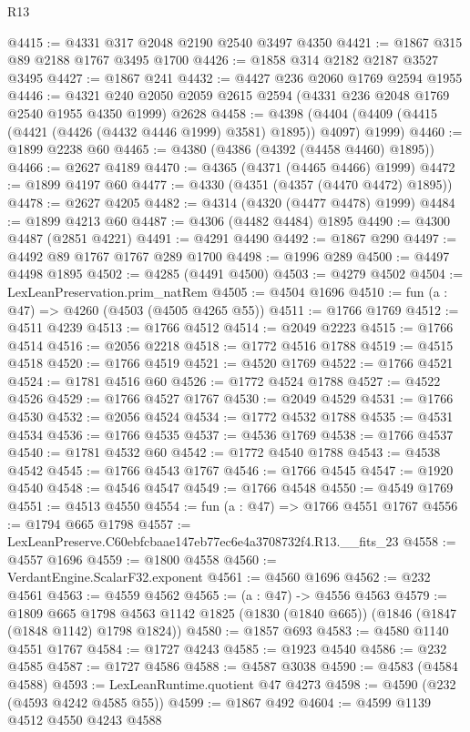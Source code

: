 \begin{lexlean}{R13}
\begin{coremodule}
@4415 := @4331 @317 @2048 @2190 @2540 @3497 @4350
@4421 := @1867 @315 @89 @2188 @1767 @3495 @1700
@4426 := @1858 @314 @2182 @2187 @3527 @3495
@4427 := @1867 @241
@4432 := @4427 @236 @2060 @1769 @2594 @1955
@4446 := @4321 @240 @2050 @2059 @2615 @2594 (@4331 @236 @2048 @1769 @2540 @1955 @4350 @1999) @2628
@4458 := @4398 (@4404 (@4409 (@4415 (@4421 (@4426 (@4432 @4446 @1999) @3581) @1895)) @4097) @1999)
@4460 := @1899 @2238 @60
@4465 := @4380 (@4386 (@4392 (@4458 @4460) @1895))
@4466 := @2627 @4189
@4470 := @4365 (@4371 (@4465 @4466) @1999)
@4472 := @1899 @4197 @60
@4477 := @4330 (@4351 (@4357 (@4470 @4472) @1895))
@4478 := @2627 @4205
@4482 := @4314 (@4320 (@4477 @4478) @1999)
@4484 := @1899 @4213 @60
@4487 := @4306 (@4482 @4484) @1895
@4490 := @4300 @4487 (@2851 @4221)
@4491 := @4291 @4490
@4492 := @1867 @290
@4497 := @4492 @89 @1767 @1767 @289 @1700
@4498 := @1996 @289
@4500 := @4497 @4498 @1895
@4502 := @4285 (@4491 @4500)
@4503 := @4279 @4502
@4504 := LexLeanPreservation.prim_natRem
@4505 := @4504 @1696
@4510 := fun (a : @47) => @4260 (@4503 (@4505 @4265 @55))
@4511 := @1766 @1769
@4512 := @4511 @4239
@4513 := @1766 @4512
@4514 := @2049 @2223
@4515 := @1766 @4514
@4516 := @2056 @2218
@4518 := @1772 @4516 @1788
@4519 := @4515 @4518
@4520 := @1766 @4519
@4521 := @4520 @1769
@4522 := @1766 @4521
@4524 := @1781 @4516 @60
@4526 := @1772 @4524 @1788
@4527 := @4522 @4526
@4529 := @1766 @4527 @1767
@4530 := @2049 @4529
@4531 := @1766 @4530
@4532 := @2056 @4524
@4534 := @1772 @4532 @1788
@4535 := @4531 @4534
@4536 := @1766 @4535
@4537 := @4536 @1769
@4538 := @1766 @4537
@4540 := @1781 @4532 @60
@4542 := @1772 @4540 @1788
@4543 := @4538 @4542
@4545 := @1766 @4543 @1767
@4546 := @1766 @4545
@4547 := @1920 @4540
@4548 := @4546 @4547
@4549 := @1766 @4548
@4550 := @4549 @1769
@4551 := @4513 @4550
@4554 := fun (a : @47) => @1766 @4551 @1767
@4556 := @1794 @665 @1798
@4557 := LexLeanPreserve.C60ebfcbaae147eb77ec6e4a3708732f4.R13.__fits_23
@4558 := @4557 @1696
@4559 := @1800 @4558
@4560 := VerdantEngine.ScalarF32.exponent
@4561 := @4560 @1696
@4562 := @232 @4561
@4563 := @4559 @4562
@4565 := (a : @47) -> @4556 @4563
@4579 := @1809
    @665
    @1798
    @4563
    @1142
    @1825
    (@1830 (@1840 @665))
    (@1846 (@1847 (@1848 @1142) @1798 @1824))
@4580 := @1857 @693
@4583 := @4580 @1140 @4551 @1767
@4584 := @1727 @4243
@4585 := @1923 @4540
@4586 := @232 @4585
@4587 := @1727 @4586
@4588 := @4587 @3038
@4590 := @4583 (@4584 @4588)
@4593 := LexLeanRuntime.quotient @47 @4273
@4598 := @4590 (@232 (@4593 @4242 @4585 @55))
@4599 := @1867 @492
@4604 := @4599 @1139 @4512 @4550 @4243 @4588

\end{coremodule}
\end{lexlean}
